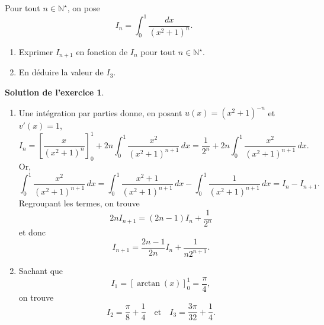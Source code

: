 \documentclass[a4paper, 11pt,openany]{article}%
\theoremstyle{plain}
\theoremstyle{definition}
\newtheorem{exo}{Exercice}
\newtheorem{sol}{Solution de l'exercice}
\theoremstyle{remark}
\newcommand{\R}{\mathbb{R}}
\newcommand{\N}{\mathbb{N}}
\begin{document}
Pour tout $n \in \N^{\star}$, on pose \[ I_n= \int_0^1 \frac{dx}{(x^2+1)^n}.\]
\begin{enumerate}
\item Exprimer $I_{n+1}$ en fonction de $I_n$ pour tout $n \in \N^{\star}$.
\item En déduire la valeur de $I_3$.
\end{enumerate}

\begin{sol}
\begin{enumerate}
\item Une intégration par parties donne, en posant $u(x)=(x^2+1)^{-n}$ et $v'(x)=1$, \[ I_n = \left[ \frac{x}{(x^2+1)^n} \right]_0^1 +2n \int_0^1 \frac{x^2}{(x^2+1)^{n+1}} \, dx
= \frac{1}{2^n}+2n \int_0^1  \frac{x^2}{(x^2+1)^{n+1}} \,dx.\]
Or, \[ \int_0^1  \frac{x^2}{(x^2+1)^{n+1}} \,dx = \int_0^1  \frac{x^2 +1}{(x^2+1)^{n+1}} \,dx  - 
\int_0^1  \frac{1}{(x^2+1)^{n+1}} \,dx = I_n - I_{n+1}.\]
Regroupant les termes, on trouve
\[ 2n I_{n+1} =(2n - 1)I_n + \frac{1}{2^n}\]
et donc
\[ I_{n+1} = \frac{2n-1}{2n} I_n + \frac{1}{n2^{n+1}}.\]
\item Sachant que
\[ I_1= [\arctan(x)]_0^1 = \frac{\pi}{4},\]
on trouve 
\[ I_2=\frac{\pi}{8} + \frac{1}{4} \quad \text{et} \quad I_3= \frac{3 \pi}{32} + \frac{1}{4}.\]
\end{enumerate}
\end{sol}




\end{document}
